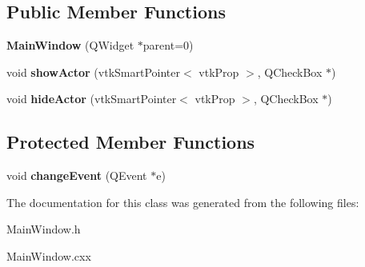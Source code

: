 \subsection*{Public Member Functions}
\begin{DoxyCompactItemize}
\item 
\hypertarget{class_main_window_a8b244be8b7b7db1b08de2a2acb9409db}{
{\bfseries MainWindow} (QWidget $\ast$parent=0)}
\label{class_main_window_a8b244be8b7b7db1b08de2a2acb9409db}

\item 
\hypertarget{class_main_window_ab25a276e0bedbb0336e3a7f681fb9fcf}{
void {\bfseries showActor} (vtkSmartPointer$<$ vtkProp $>$, QCheckBox $\ast$)}
\label{class_main_window_ab25a276e0bedbb0336e3a7f681fb9fcf}

\item 
\hypertarget{class_main_window_ac9cec274c3c25fee79ccbc763355265a}{
void {\bfseries hideActor} (vtkSmartPointer$<$ vtkProp $>$, QCheckBox $\ast$)}
\label{class_main_window_ac9cec274c3c25fee79ccbc763355265a}

\end{DoxyCompactItemize}
\subsection*{Protected Member Functions}
\begin{DoxyCompactItemize}
\item 
\hypertarget{class_main_window_af4ca5d0d3d18ddcb7d54b6596bbf4797}{
void {\bfseries changeEvent} (QEvent $\ast$e)}
\label{class_main_window_af4ca5d0d3d18ddcb7d54b6596bbf4797}

\end{DoxyCompactItemize}


The documentation for this class was generated from the following files:\begin{DoxyCompactItemize}
\item 
MainWindow.h\item 
MainWindow.cxx\end{DoxyCompactItemize}
